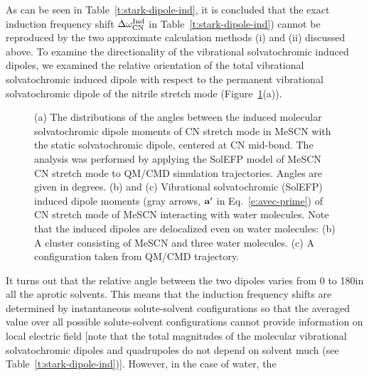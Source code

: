 \documentclass[a4paper,titlepage,twoside,fleqn,12pt]{book}
\begin{document}
\begin{refsection}
As can be seen in Table~\ref{t:stark-dipole-ind}, it is concluded that the exact
induction frequency shift $\Delta\omega_{\rm CN}^{\rm Ind}$ 
in Table~\ref{t:stark-dipole-ind}) cannot be
reproduced by the two approximate calculation methods (i)
and (ii) discussed above. To examine the directionality of the
vibrational solvatochromic induced dipoles, we examined the
relative orientation of the total vibrational solvatochromic
induced dipole with respect to the permanent vibrational
solvatochromic dipole of the nitrile stretch mode (Figure~\ref{f:solv-dip-directionality}(a)). 
%
\begin{figure}[t!]
\centering
\setlength\fboxsep{0.4pt}
\setlength\fboxrule{0.5pt}
\caption{
(a) The distributions of the angles between the induced molecular solvatochromic
dipole moments of CN stretch mode in MeSCN with the static solvatochromic dipole,
centered at CN mid\hyp{}bond. The analysis was performed by applying the SolEFP model of
MeSCN CN stretch mode to QM/CMD simulation trajectories. Angles are given in degrees.
(b) and (c) Vibrational solvatochromic (SolEFP) induced dipole moments 
(gray arrows, ${\bf a}'$ in Eq.~\eqref{e:avec-prime}) of CN stretch
mode of MeSCN interacting with water molecules. Note that the induced dipoles are delocalized even on
water molecules: (b) A cluster consisting of MeSCN and three water molecules. (c) A configuration taken
from QM/CMD trajectory.
\label{f:solv-dip-directionality}}
\end{figure}
%
It turns out that the relative angle between the two
dipoles varies from 0 to 180\textdegree in all the aprotic solvents. This
means that the induction frequency shifts are determined by
instantaneous solute\hyp{}solvent configurations so that the
averaged value over all possible solute\hyp{}solvent configurations
cannot provide information on local electric field [note that
the total magnitudes of the molecular vibrational
solvatochromic dipoles and quadrupoles do not depend on
solvent much (see Table~\ref{t:stark-dipole-ind})]. However, in the case of water, the

\end{refsection}
\end{document}
